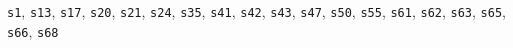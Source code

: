\texttt{s1}, \texttt{s13}, \texttt{s17}, \texttt{s20}, \texttt{s21}, \texttt{s24}, \texttt{s35}, \texttt{s41}, \texttt{s42}, \texttt{s43}, \texttt{s47}, \texttt{s50}, \texttt{s55}, \texttt{s61}, \texttt{s62}, \texttt{s63}, \texttt{s65}, \texttt{s66}, \texttt{s68}
